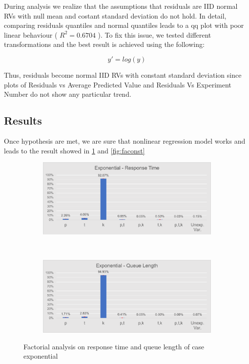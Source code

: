 \documentclass[a4paper,12pt]{article}
\begin{document}
During analysis we realize that the assumptions that residuals are IID normal RVs with null mean and costant standard deviation do not hold.
In detail, comparing residuals quantiles and normal quantiles leads to a qq plot with poor linear behaviour ( $R^2 = 0.6704$ ). To fix this issue, we tested different transformations and the best result is achieved using the following:

$$y' = log(y)$$

Thus, residuals become normal IID RVs with constant standard deviation since plots of Residuals vs Average Predicted Value and Residuals Vs Experiment Number do not show any particular trend.

\subsection{Results}
Once hypothesis are met, we are sure that nonlinear regression model works and leads to the result showed in \ref{fig:faexp} and \ref{fig:faconst}

\begin{figure}[H]
  \centering
  \begin{subfigure}[b]{.45\textwidth}
    \includegraphics[width=\textwidth]{img/FactorAnalysisResponseTimeEXP.pdf}
  \end{subfigure}
  ~
  \begin{subfigure}[b]{.45\textwidth}
    \includegraphics[width=\textwidth]{img/FactorAnalysisQueueLengthEXP.pdf}
  \end{subfigure}
  \caption{Factorial analysis on response time and queue length of case exponential }
  \label{fig:faexp}
\end{figure}
\end{document}
